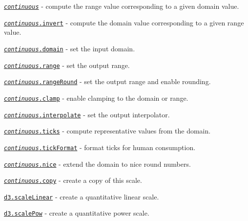 \begin{DoxyItemize}
\item \href{https://github.com/d3/d3-scale/blob/master/README.md#_continuous}{\tt {\itshape continuous}} -\/ compute the range value corresponding to a given domain value.
\item \href{https://github.com/d3/d3-scale/blob/master/README.md#continuous_invert}{\tt {\itshape continuous}.invert} -\/ compute the domain value corresponding to a given range value.
\item \href{https://github.com/d3/d3-scale/blob/master/README.md#continuous_domain}{\tt {\itshape continuous}.domain} -\/ set the input domain.
\item \href{https://github.com/d3/d3-scale/blob/master/README.md#continuous_range}{\tt {\itshape continuous}.range} -\/ set the output range.
\item \href{https://github.com/d3/d3-scale/blob/master/README.md#continuous_rangeRound}{\tt {\itshape continuous}.range\+Round} -\/ set the output range and enable rounding.
\item \href{https://github.com/d3/d3-scale/blob/master/README.md#continuous_clamp}{\tt {\itshape continuous}.clamp} -\/ enable clamping to the domain or range.
\item \href{https://github.com/d3/d3-scale/blob/master/README.md#continuous_interpolate}{\tt {\itshape continuous}.interpolate} -\/ set the output interpolator.
\item \href{https://github.com/d3/d3-scale/blob/master/README.md#continuous_ticks}{\tt {\itshape continuous}.ticks} -\/ compute representative values from the domain.
\item \href{https://github.com/d3/d3-scale/blob/master/README.md#continuous_tickFormat}{\tt {\itshape continuous}.tick\+Format} -\/ format ticks for human consumption.
\item \href{https://github.com/d3/d3-scale/blob/master/README.md#continuous_nice}{\tt {\itshape continuous}.nice} -\/ extend the domain to nice round numbers.
\item \href{https://github.com/d3/d3-scale/blob/master/README.md#continuous_copy}{\tt {\itshape continuous}.copy} -\/ create a copy of this scale.
\item \href{https://github.com/d3/d3-scale/blob/master/README.md#scaleLinear}{\tt d3.\+scale\+Linear} -\/ create a quantitative linear scale.
\item \href{https://github.com/d3/d3-scale/blob/master/README.md#scalePow}{\tt d3.\+scale\+Pow} -\/ create a quantitative power scale.

\end{DoxyItemize}
